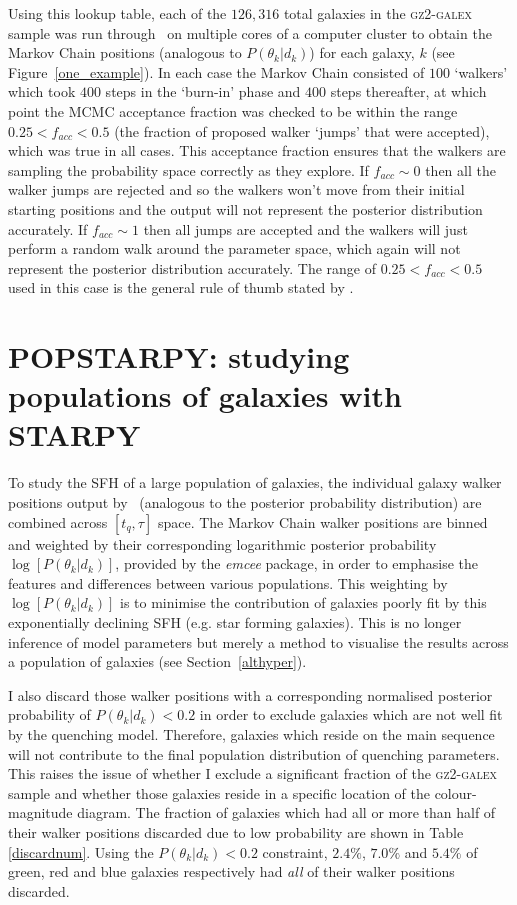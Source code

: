 Using this lookup table, each of the $126,316$ total galaxies in the \textsc{gz2-galex} sample was run through \starpy ~on multiple cores of a computer cluster to obtain the Markov Chain positions (analogous to $P(\theta_k|d_k)$) for each galaxy, $k$ (see Figure~\ref{one_example}). In each case the Markov Chain consisted of $100$ `walkers' which took $400$ steps in the `burn-in' phase and $400$ steps thereafter, at which point the MCMC acceptance fraction was checked to be within the range $0.25 < f_{acc} < 0.5$ (the fraction of proposed walker `jumps' that were accepted), which was true in all cases. This acceptance fraction ensures that the walkers are sampling the probability space correctly as they explore. If $f_{acc} \sim 0$ then all the walker jumps are rejected and so the walkers won't move from their initial starting positions and the output will not represent the posterior distribution accurately. If $f_{acc} \sim 1$ then all jumps are accepted and the walkers will just perform a random walk around the parameter space, which again will not represent the posterior distribution accurately. The range of $0.25 < f_{acc} < 0.5$ used in this case is the general rule of thumb stated by \citet*{gelman96}.


\section{POPSTARPY: studying populations of galaxies with STARPY}\label{popstarpy}

To study the SFH of a large population of galaxies, the individual galaxy walker positions output by \starpy ~(analogous to the posterior probability distribution) are combined across $[t_q, \tau]$ space. The Markov Chain walker positions are binned and weighted by their corresponding logarithmic posterior probability $\log [P(\theta_k|d_k)]$, provided by the \emph{emcee} package, in order to emphasise the features and differences between various populations. This weighting by $\log [P(\theta_k|d_k)]$ is to minimise the contribution of galaxies poorly fit by this exponentially declining SFH (e.g. star forming galaxies). This is no longer inference of model parameters but merely a method to visualise the results across a population of galaxies (see Section~\ref{althyper}).

I also discard those walker positions with a corresponding normalised posterior probability of $P(\theta_k|d_k) < 0.2$ in order to exclude galaxies which are not well fit by the quenching model. Therefore, galaxies which reside on the main sequence will not contribute to the final population distribution of quenching parameters. This raises the issue of whether I exclude a significant fraction of the \textsc{gz2-galex} sample and whether those galaxies reside in a specific location of the colour-magnitude diagram. The fraction of galaxies which had all or more than half of their walker positions discarded due to low probability are shown in Table \ref{discardnum}. Using the $P(\theta_k|d_k) < 0.2$ constraint, $2.4\%$, $7.0\%$ and $5.4\%$ of green, red and blue galaxies respectively had \emph{all} of their walker positions discarded. 

